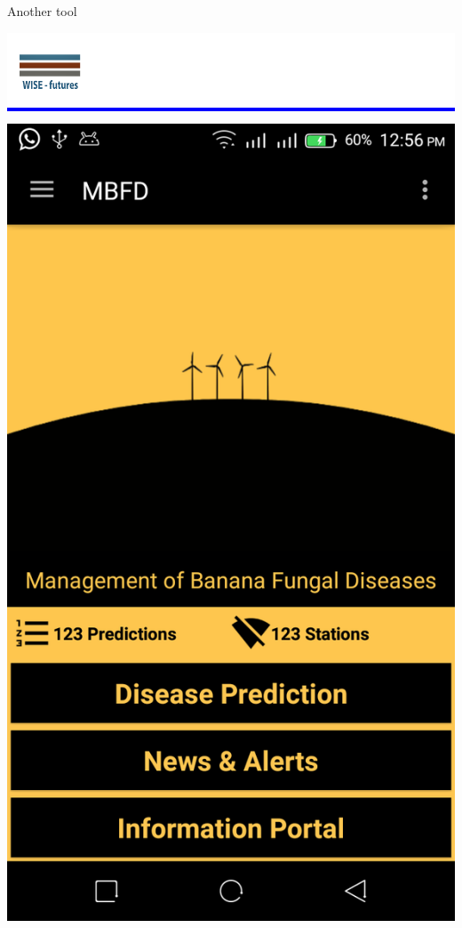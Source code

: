 \documentclass{beamer}
\begin{document}
\begin{frame}{Another tool}
\begin{center}
\colorbox{blue}{\includegraphics[width=\textwidth]{figs/wisesmall.png}}
	\end{center}
\centering
\begin{minipage}[b]{0.4\textwidth}
	\includegraphics[width=\textwidth]{figs/banana2.png}

\end{minipage}
\end{frame}
\end{document}
